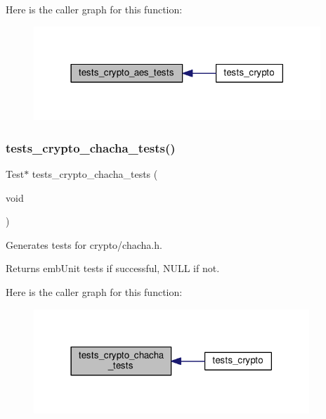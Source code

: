 Here is the caller graph for this function\+:
\nopagebreak
\begin{figure}[H]
\begin{center}
\leavevmode
\includegraphics[width=306pt]{group__unittests_ga19bbedd30b2147c5418e225af2ce5d73_icgraph}
\end{center}
\end{figure}
\mbox{\label{group__unittests_ga57ccd7e24b05012c775da48c9d521939}} 
\subsubsection{\texorpdfstring{tests\+\_\+crypto\+\_\+chacha\+\_\+tests()}{tests\_crypto\_chacha\_tests()}}
{\footnotesize\ttfamily Test$\ast$ tests\+\_\+crypto\+\_\+chacha\+\_\+tests (\begin{DoxyParamCaption}\item[{void}]{ }\end{DoxyParamCaption})}



Generates tests for crypto/chacha.\+h. 

\begin{DoxyReturn}{Returns}
emb\+Unit tests if successful, N\+U\+LL if not. 
\end{DoxyReturn}
Here is the caller graph for this function\+:
\nopagebreak
\begin{figure}[H]
\begin{center}
\leavevmode
\includegraphics[width=294pt]{group__unittests_ga57ccd7e24b05012c775da48c9d521939_icgraph}
\end{center}
\end{figure}
\mbox{\label{group__unittests_ga0da52ebef74d5bf263ce63858f7dea0c}} 
